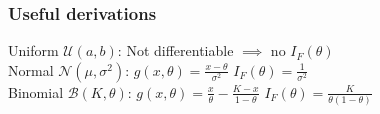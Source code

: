 \begin{mdframed}[style=eqbox]
  \subsubsection{Useful derivations}
  Uniform $\mathcal{U}(a,b)$: Not differentiable $\implies$ no $I_F(\theta)$\\[0.25em]
  Normal $\mathcal{N}(\mu, \sigma^2)$: $g(x,\theta) = \frac{x - \theta}{\sigma^2}$ $I_F(\theta) = \frac{1}{\sigma^2}$\\[0.25em]
  Binomial $\mathcal{B}(K, \theta)$: $g(x,\theta) = \frac{x}{\theta} - \frac{K-x}{1-\theta}$ $I_F(\theta) = \frac{K}{\theta(1-\theta)}$\\[0.25em]
\end{mdframed}

